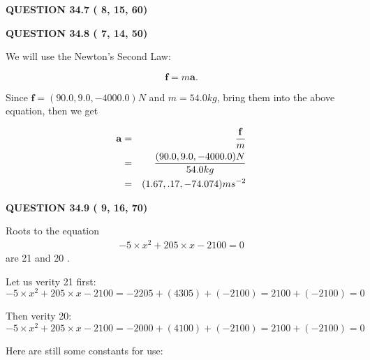 \documentclass[12pt]{article}
\begin{document}
  
  
\vspace{0.2in}
  
{\textbf{\Large{QUESTION
34.7 
 (          8,         15,         60)
}}}
  
  
 
 

 
 
  
\vspace{0.2in}
  
{\textbf{\Large{QUESTION
34.8 
 (          7,         14,         50)
}}}
  
  
 
 

We will use the Newton's Second Law:
 
\[
\mathbf{f}=m\mathbf{a}.
\]
 
Since $\mathbf{f}= %
(90.0 , 9.0 , -4000.0) N$
and $m= %
54.0kg$, bring them into the above equation, then we get
 
\begin{eqnarray*}
\mathbf{a}&=&\frac{\mathbf{f}}m  \\
&=&\frac{ %
(90.0 , 9.0 , -4000.0) N}{ %
54.0kg}  \\
&=& %
(1.67 , .17 , -74.074) ms^{-2}
\end{eqnarray*}
 
 
 
  
\vspace{0.2in}
  
{\textbf{\Large{QUESTION
34.9 
 (          9,         16,         70)
}}}
  
  


 
 

Roots to the equation
\begin{eqnarray*}
-5 \times x^2  %
+  %
205
                 \times x    %
-2100 =0
\end{eqnarray*}
are  %
21 and  %
20 .
 
Let us verity  %
21 first:
$  %
-5 \times x^2  %
+  %
205
                 \times x    %
-2100
  = %
-2205+( %
4305)+( %
-2100)
  = %
2100+( %
-2100)
  = %
0
$
 
Then verity  %
20:
$  %
-5 \times x^2  %
+  %
205
                 \times x    %
-2100
  = %
-2000+( %
4100)+( %
-2100)
  = %
2100+( %
-2100)
  = %
0
$
 
 
 
   
   
 \vspace{0.2in}
Here are still some constants for use:
 
\end{document}
